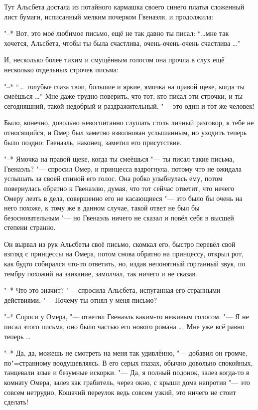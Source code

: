 Тут Альсбета достала из потайного кармашка своего синего платья сложенный лист
бумаги, исписанный мелким почерком Гвенаэля, и продолжила:

"--* Вот, это моё любимое письмо, ещё не так давно ты писал:
\enquote{\ldots мне так хочется, Альсбета, чтобы ты была счастлива, очень-очень-очень
счастлива \ldots}

И, несколько более тихим и смущённым голосом она прочла в слух ещё несколько
отдельных строчек письма:

"--* \enquote{\ldots\ голубые глаза твои, большие и яркие, ямочка на правой щеке,
когда ты смеёшься \ldots}
Мне даже трудно поверить, что тот, кто писал эти строчки, и ты сегодняшний,
такой недобрый и раздражительный, "--- это один и тот же человек!

Было, конечно, довольно невоспитанно слушать столь личный разговор, к тебе не
относящийся, и Омер был заметно взволнован услышанным, но уходить теперь было
поздно: Гвенаэль, наконец, заметил его присутствие.

"--* Ямочка на правой щеке, когда ты смеёшься "--- ты писал такие письма,
Гвенаэль? "--- спросил Омер, и принцесса вздрогнула, потому что не ожидала
услышать за своей спиной его голос.
Она робко улыбнулась ему, потом повернулась обратно к Гвенаэлю, думая, что тот
сейчас ответит, что нечего Омеру лезть в дела, совершенно его не касающиеся "---
это было бы очень на него похоже, к тому же в данном случае, такой ответ не был
бы безосновательным "--- но Гвенаэль ничего не сказал и повёл себя в высшей
степени странно.

Он вырвал из рук Альсбеты своё письмо, скомкал его, быстро перевёл свой взгляд с
принцессы на Омера, потом снова обратно на принцессу, открыл рот, как будто
собирался что-то ответить, но, издав непонятный гортанный звук, по тембру
похожий на заикание, замолчал, так ничего и не сказав.

"--* Что это значит? "--- спросила Альсбета, испуганная его странными
действиями.
"--- Почему ты отнял у меня письмо?

"--* Спроси у Омера, "--- ответил Гвенаэль каким-то неживым голосом.
"--- Я не писал этого письма, оно было частью его нового романа \ldots\
Мне уже всё равно теперь \ldots

"--* Да, да, можешь не смотреть на меня так удивлённо, "--- добавил он громче,
по"=странному воодушевляясь.
В его серых глазах, обычно довольно спокойных, танцевали злые и безумные
искорки.
"--- Да, я полный подонок, залез когда-то в комнату Омера, залез как грабитель,
через окно, с крыши дома напротив "--- это совсем нетрудно, Кошачий переулок
ведь совсем узкий, это ничего не стоит сделать!

